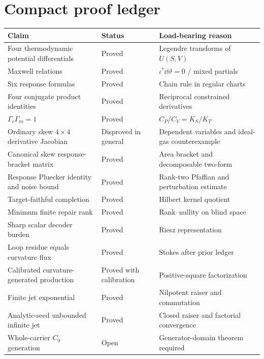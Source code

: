 \appendix

\section{Compact proof ledger}

\begin{center}
\small
\begin{tabular}{p{}p{}p{}}
\toprule
Claim & Status & Load-bearing reason\\
\midrule
Four thermodynamic potential differentials & Proved & Legendre transforms of $U(S,V)$\\
Maxwell relations & Proved & $\iota^*\dd\vartheta=0$ / mixed partials\\
Six response formulas & Proved & Chain rule in regular charts\\
Four conjugate product identities & Proved & Reciprocal constrained derivatives\\
$\Gamma_c\Gamma_m=1$ & Proved & $C_P/C_V=K_S/K_T$\\
Ordinary skew $4\times4$ derivative Jacobian & Disproved in general & Dependent variables and ideal-gas counterexample\\
Canonical skew response-bracket matrix & Proved & Area bracket and decomposable two-form\\
Response Pluecker identity and noise bound & Proved & Rank-two Pfaffian and perturbation estimate\\
Target-faithful completion & Proved & Hilbert kernel quotient\\
Minimum finite repair rank & Proved & Rank--nullity on blind space\\
Sharp scalar decoder burden & Proved & Riesz representation\\
Loop residue equals curvature flux & Proved & Stokes after prior ledger\\
Calibrated curvature-generated production & Proved with calibration & Positive-square factorization\\
Finite jet exponential & Proved & Nilpotent raiser and commutation\\
Analytic-seed unbounded infinite jet & Proved & Closed raiser and factorial convergence\\
Whole-carrier $C_0$ generation & Open & Generator-domain theorem required\\
\bottomrule
\end{tabular}
\end{center}

